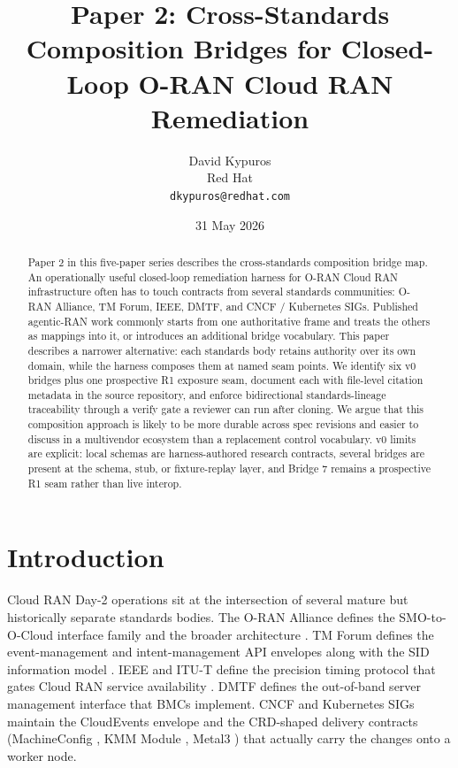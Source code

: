 \documentclass[twocolumn,10pt,a4paper]{article}
\title{Paper 2: Cross-Standards Composition Bridges for Closed-Loop O-RAN Cloud RAN Remediation}
\author{David Kypuros \\
\small Red Hat \\
\small \texttt{dkypuros@redhat.com}}
\date{31 May 2026}
\begin{document}
\maketitle

\begin{abstract}
Paper 2 in this five-paper series describes the cross-standards composition bridge map. An operationally useful closed-loop remediation harness for O-RAN Cloud RAN infrastructure often has to touch contracts from several standards communities: O-RAN Alliance, TM Forum, IEEE, DMTF, and CNCF / Kubernetes SIGs. Published agentic-RAN work commonly starts from one authoritative frame and treats the others as mappings into it, or introduces an additional bridge vocabulary. This paper describes a narrower alternative: each standards body retains authority over its own domain, while the harness composes them at named seam points. We identify six v0 bridges plus one prospective R1 exposure seam, document each with file-level citation metadata in the source repository, and enforce bidirectional standards-lineage traceability through a verify gate a reviewer can run after cloning. We argue that this composition approach is likely to be more durable across spec revisions and easier to discuss in a multivendor ecosystem than a replacement control vocabulary. v0 limits are explicit: local schemas are harness-authored research contracts, several bridges are present at the schema, stub, or fixture-replay layer, and Bridge 7 remains a prospective R1 seam rather than live interop.
\end{abstract}

\section{Introduction}

Cloud RAN Day-2 operations sit at the intersection of several mature but historically separate standards bodies. The O-RAN Alliance defines the SMO-to-O-Cloud interface family \cite{oran_o2_ganp,oran_o2_ims,oran_o2_dms} and the broader architecture \cite{oran_wg1_arch}. TM Forum defines the event-management and intent-management API envelopes \cite{tmf688,tmf921} along with the SID information model \cite{tmf_gb922}. IEEE and ITU-T define the precision timing protocol that gates Cloud RAN service availability \cite{ieee_1588_2019,itu_g82751}. DMTF defines the out-of-band server management interface \cite{dmtf_redfish} that BMCs implement. CNCF and Kubernetes SIGs maintain the CloudEvents envelope \cite{cncf_cloudevents} and the CRD-shaped delivery contracts (MachineConfig \cite{openshift_mco}, KMM Module \cite{kmm_operator}, Metal3 \cite{metal3_project,metal3_bmo}) that actually carry the changes onto a worker node.
\end{document}
